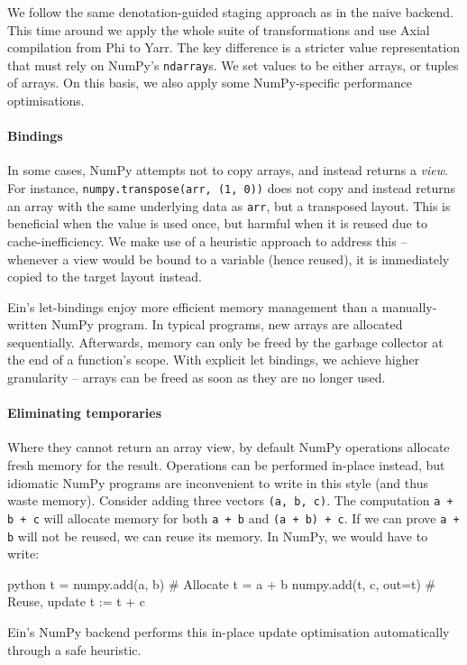 We follow the same denotation-guided staging approach as in the naive backend. This time around we apply the whole suite of transformations and use Axial compilation from Phi to Yarr. The key difference is a stricter value representation that must rely on NumPy's \texttt{ndarray}s. We set values to be either arrays, or tuples of arrays. On this basis, we also apply some NumPy-specific performance optimisations.

\paragraph{Bindings} In some cases, NumPy attempts not to copy arrays, and instead returns a \textit{view}. For instance, \texttt{numpy.transpose(arr, (1, 0))} does not copy and instead returns an array with the same underlying data as \texttt{arr}, but a transposed layout. This is beneficial when the value is used once, but harmful when it is reused due to cache-inefficiency. We make use of a heuristic approach to address this -- whenever a view would be bound to a variable (hence reused), it is immediately copied to the target layout instead. 

Ein's let-bindings enjoy more efficient memory management than a manually-written NumPy program. In typical programs, new arrays are allocated sequentially. Afterwards, memory can only be freed by the garbage collector at the end of a function's scope. With explicit let bindings, we achieve higher granularity -- arrays can be freed as soon as they are no longer used.

\paragraph{Eliminating temporaries} Where they cannot return an array view, by default NumPy operations allocate fresh memory for the result. Operations can be performed in-place instead, but idiomatic NumPy programs are inconvenient to write in this style (and thus waste memory). Consider adding three vectors \texttt{(a, b, c)}. The computation \texttt{a + b + c} will allocate memory for both \texttt{a + b} and \texttt{(a + b) + c}. If we can prove \texttt{a + b} will not be reused, we can reuse its memory. In NumPy, we would have to write:
\begin{center}
\begin{cminted}{python}
t = numpy.add(a, b)     # Allocate t = a + b
numpy.add(t, c, out=t)  # Reuse, update t := t + c
\end{cminted}
\end{center}
Ein's NumPy backend performs this in-place update optimisation automatically through a safe heuristic.

